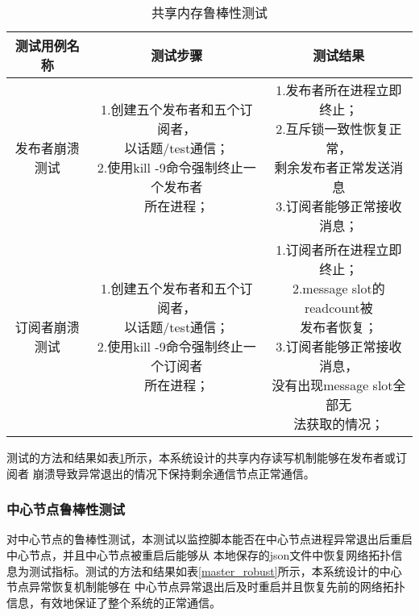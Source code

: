 \begin{table}[H]
  \centering\small
  \caption{共享内存鲁棒性测试}
  \renewcommand\arraystretch{1.2}
  \label{shared_memory_robust}
  \begin{tabular}{ccc}
    \toprule
    测试用例名称 & 测试步骤 & 测试结果 \\
    \midrule
    发布者崩溃测试 & \makecell[l]{1.创建五个发布者和五个订阅者，\\以话题/test通信；\\2.使用kill -9命令强制终止一个发布者\\所在进程；} & \makecell[l]{1.发布者所在进程立即终止；\\2.互斥锁一致性恢复正常，\\剩余发布者正常发送消息\\3.订阅者能够正常接收消息；}\\
    \hline
    订阅者崩溃测试 & \makecell[l]{1.创建五个发布者和五个订阅者，\\以话题/test通信；\\2.使用kill -9命令强制终止一个订阅者\\所在进程；} & \makecell[l]{1.订阅者所在进程立即终止；\\2.message slot的readcount被\\发布者恢复；\\3.订阅者能够正常接收消息，\\没有出现message slot全部无\\法获取的情况；} \\
    \bottomrule
  \end{tabular}
\end{table}
测试的方法和结果如表\ref{shared_memory_robust}所示，本系统设计的共享内存读写机制能够在发布者或订阅者
崩溃导致异常退出的情况下保持剩余通信节点正常通信。

\subsubsection{中心节点鲁棒性测试}
对中心节点的鲁棒性测试，本测试以监控脚本能否在中心节点进程异常退出后重启中心节点，并且中心节点被重启后能够从
本地保存的json文件中恢复网络拓扑信息为测试指标。测试的方法和结果如表\ref{master_robust}所示，本系统设计的中心节点异常恢复机制能够在
中心节点异常退出后及时重启并且恢复先前的网络拓扑信息，有效地保证了整个系统的正常通信。


